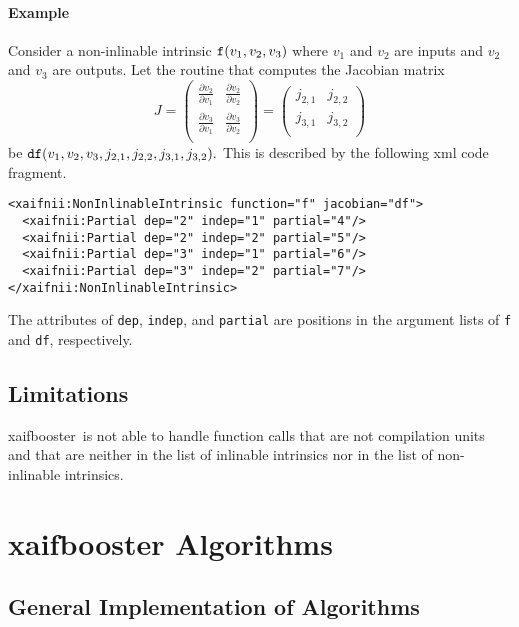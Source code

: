 \documentclass{book}
\newcommand{\xaifbooster}{xaifbooster}
\begin{document}
\subsubsection{Example}

Consider a non-inlinable intrinsic ${\tt f}(v_1,v_2,v_3)$ 
where $v_1$ and $v_2$ are inputs and
$v_2$ and $v_3$ are outputs. Let the routine that
computes the Jacobian matrix
$$
J =
\begin{pmatrix}
\frac{\partial v_2}{\partial v_1} & \frac{\partial v_2}{\partial v_2} \\
\frac{\partial v_3}{\partial v_1} & \frac{\partial v_3}{\partial v_2} \\
\end{pmatrix} =
\begin{pmatrix}
j_{2,1} & j_{2,2} \\
j_{3,1} & j_{3,2} \\
\end{pmatrix} 
$$
be ${\tt df}(v_1,v_2,v_3,j_{2,1},j_{2,2},j_{3,1},j_{3,2}).$
This is described by the following xml code fragment.
\begin{verbatim}
<xaifnii:NonInlinableIntrinsic function="f" jacobian="df">
  <xaifnii:Partial dep="2" indep="1" partial="4"/>
  <xaifnii:Partial dep="2" indep="2" partial="5"/>
  <xaifnii:Partial dep="3" indep="1" partial="6"/>
  <xaifnii:Partial dep="3" indep="2" partial="7"/>
</xaifnii:NonInlinableIntrinsic>
\end{verbatim}
The attributes of {\tt dep}, {\tt indep}, and {\tt partial} are
positions in the argument lists of {\tt f} and {\tt df}, respectively.



\section{Limitations}
\label{sec:xaifbooster_limitations}

\xaifbooster~is not able to handle function calls that are not
compilation units
and that are neither
in the list of inlinable intrinsics nor in the list of non-inlinable
intrinsics.

\chapter{xaifbooster Algorithms}

\section{General Implementation of Algorithms}
\label{sec:General_Implementation_of_Algorithms}
\end{document}
